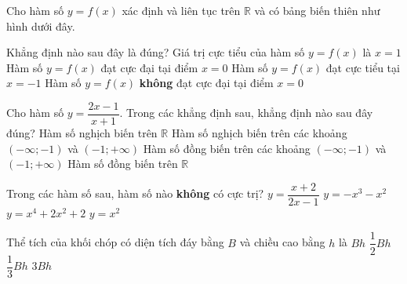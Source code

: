 \begin{ex}%
Cho hàm số $y=f(x)$ xác định và liên tục trên $\mathbb{R}$ và có bảng biến thiên như hình dưới đây.
\begin{center}
\end{center}
 Khẳng định nào sau đây là đúng?
\choice
{Giá trị cực tiểu của hàm số $y=f(x)$ là $x=1$}
{\True Hàm số $y=f(x)$ đạt cực đại tại điểm $x=0$}
{Hàm số $y=f(x)$ đạt cực tiểu tại $x=-1$}
{Hàm số $y=f(x)$ {\bf không} đạt cực đại tại điểm $x=0$}
\end{ex}
\begin{ex}%
Cho hàm số $y=\dfrac{2x-1}{x+1}$. Trong các khẳng định sau, khẳng định nào sau đây đúng?
\choice
{Hàm số nghịch biến trên $\mathbb{R}$}
{Hàm số nghịch biến trên các khoảng $(-\infty; -1)$ và $(-1;+\infty)$}
{\True Hàm số đồng biến trên các khoảng $(-\infty; -1)$ và $(-1;+\infty)$}
{Hàm số đồng biến trên $\mathbb{R}$}
\end{ex}
\begin{ex}%
Trong các hàm số sau, hàm số nào {\bf không} có cực trị?
\choice
{\True $y=\dfrac{x+2}{2x-1}$}
{$y=-x^3-x^2$}
{$y=x^4+2x^2+2$}
{$y=x^2$}
\end{ex}
\begin{ex}%
Thể tích của khối chóp có diện tích đáy bằng $B$ và chiều cao bằng $h$ là
\choice
{$Bh$}
{$\dfrac{1}{2}Bh$}
{\True $\dfrac{1}{3}Bh$}
{$3Bh$}
\end{ex}
